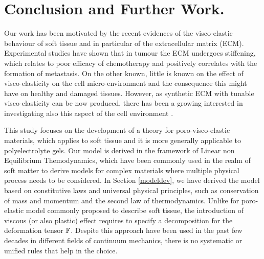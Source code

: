 \section{Conclusion and Further Work.}

Our work has been motivated by the recent evidences of the visco-elastic behaviour of soft tissue and in particular of the extracellular matrix (ECM). Experimental studies have shown that in tumour the ECM undergoes stiffening, which relates to poor efficacy of chemotherapy and positively correlates with the formation of metastasis. On the other known, little is known on the effect of visco-elasticity on the cell micro-environment and the consequence this might have on healthy and damaged tissues. However, as synthetic ECM with tunable visco-elasticity can be now produced, there has been a growing interested in investigating also this aspect of the cell environment \cite{stanford}.

This study focuses on the development of a theory for poro-visco-elastic materials, which applies to soft tissue and it is more generally applicable to polyelectrolyte gels. Our model is derived in the framework of Linear non Equilibrium Themodynamics, which have been commonly used in the realm of soft matter to derive models for complex materials where multiple physical process needs to be considered. In Section \ref{modeldev}, we have derived the model based on constitutive laws and universal physical principles, such as conservation of mass and momentum and the second law of thermodynamics. Unlike for poro-elastic model commonly proposed to describe soft tissue, the introduction of viscous (or also plastic) effect requires to specify a decomposition for the deformation tensor $\mathbb{F}$. Despite this approach have been used in the past few decades in different fields of continuum mechanics, there is no systematic or unified rules that help in the choice. 

